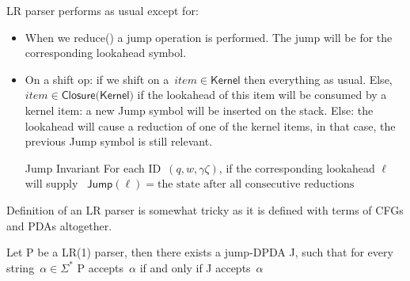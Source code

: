 LR parser performs as usual except for:

\begin{itemize}
	\item When we \textsf{reduce()} a jump operation is performed.
	  The jump will be for the corresponding lookahead symbol.
	  
	\item On a shift op:
	if we shift on a~$item \in \textsf{Kernel}$
	  then everything as usual.
	Else,~$item \in \textsf{Closure(Kernel)}$
	    if the lookahead of this item will be consumed by a kernel item:
	      a new Jump symbol will be inserted on the stack.
	    Else:
	      the lookahead will cause a reduction of one of the kernel items,
	      in that case, the previous Jump symbol is still relevant.
	\item[Jump Invariant] For each ID~$(q,w,\gamma \zeta)$, if the corresponding lookahead $\ell$ will supply
	  ~$\textsf{Jump}(\ell)= \text{the state after all consecutive reductions}$
\end{itemize}
Definition of an LR parser is somewhat tricky as it is defined with terms of 
  CFGs and PDAs altogether.
\begin{Definition}
	Let P be a LR(1) parser, then there exists a jump-DPDA J,
	such that for every string~$\alpha \in \Sigma ^ *$
	P accepts~$\alpha$ if and only if J accepts~$\alpha$ 
\end{Definition}



